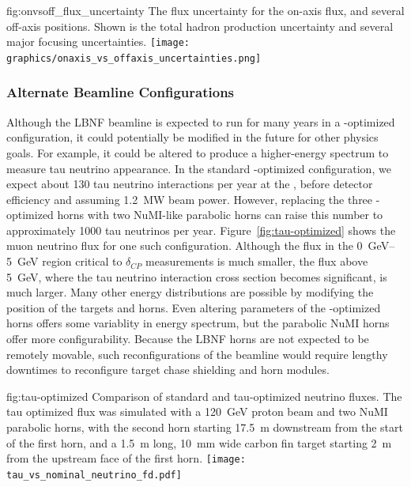 
\begin{dunefigure}{fig:onvsoff_flux_uncertainty}
{The flux uncertainty for the on-axis flux, and several off-axis positions. Shown is the total hadron production uncertainty and several major focusing uncertainties.}
    \texttt{[image: graphics/onaxis\_vs\_offaxis\_uncertainties.png]}
\end{dunefigure}

\subsubsection{Alternate Beamline Configurations}

Although the LBNF beamline is expected to run for many years in a -optimized configuration, it could potentially be modified in the future for other physics goals.  For example, it could be altered to produce a higher-energy spectrum %
to measure tau neutrino appearance.  In the standard -optimized configuration, we expect about 130 tau neutrino  interactions per year %
at the , before detector efficiency and assuming \SI{1.2}{MW} beam power.  However, replacing the three -optimized horns with two NuMI-like parabolic horns can raise this number to approximately \num{1000} tau neutrinos per year.  Figure~\ref{fig:tau-optimized} shows the muon neutrino flux for one such configuration.  Although the flux in the \SIrange{0}{5}{\GeV} region critical to $\delta_{CP}$ measurements is much smaller, the flux above \SI{5}{\GeV}, where the tau neutrino interaction cross section becomes significant, is much larger.  Many other energy distributions are possible by modifying the position of the targets and horns.  Even altering parameters of the -optimized horns offers some variablity in energy spectrum, but the parabolic NuMI horns offer more configurability.  Because the LBNF horns are not expected to be remotely movable, such reconfigurations of the beamline would require lengthy downtimes to reconfigure target chase shielding and horn modules.   

\begin{dunefigure}{fig:tau-optimized}
{Comparison of standard and tau-optimized neutrino fluxes.  The tau optimized flux was simulated with a \SI{120}{\GeV} proton beam and two NuMI parabolic horns, with the second horn starting \SI{17.5}{m}
downstream from the start of the first horn, and a \SI{1.5}{m} long, \SI{10}{mm} wide carbon fin target starting \SI{2}{m} from the upstream face of the first horn.  
}
\texttt{[image: tau\_vs\_nominal\_neutrino\_fd.pdf]}
\end{dunefigure}

